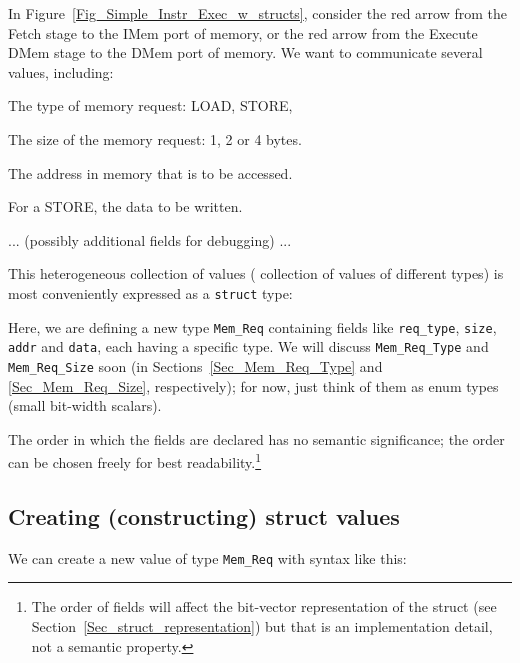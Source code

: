 In Figure~\ref{Fig_Simple_Instr_Exec_w_structs}, consider the red
arrow from the Fetch stage to the IMem port of memory, or the red
arrow from the Execute DMem stage to the DMem port of memory.  We want
to communicate several values, including:

\begin{tightlist}
 \item The type of memory request: LOAD, STORE, {\etc}
 \item The size of the memory request: 1, 2 or 4 bytes.
 \item The address in memory that is to be accessed.
 \item For a STORE, the data to be written.
 \item ... (possibly additional fields for debugging) ...
\end{tightlist}


This heterogeneous collection of values ({\ie} collection of values of
different types) is most conveniently expressed as a \verb|struct|
type:


Here, we are defining a new type {\tt Mem\_Req} containing fields like
{\tt req\_type}, {\tt size}, {\tt addr} and {\tt data}, each having a
specific type.  We will discuss \verb|Mem_Req_Type| and
\verb|Mem_Req_Size| soon (in Sections~\ref{Sec_Mem_Req_Type} and
\ref{Sec_Mem_Req_Size}, respectively); for now, just think of them as
enum types (small bit-width scalars).

The order in which the fields are declared has no semantic
significance; the order can be chosen freely for best
readability.\footnote{The order of fields will affect the bit-vector
representation of the struct (see
Section~\ref{Sec_struct_representation}) but that is an implementation
detail, not a semantic property.}


\subsection{Creating (constructing) struct values}


We can create a new value of type \verb|Mem_Req| with syntax like
this:

